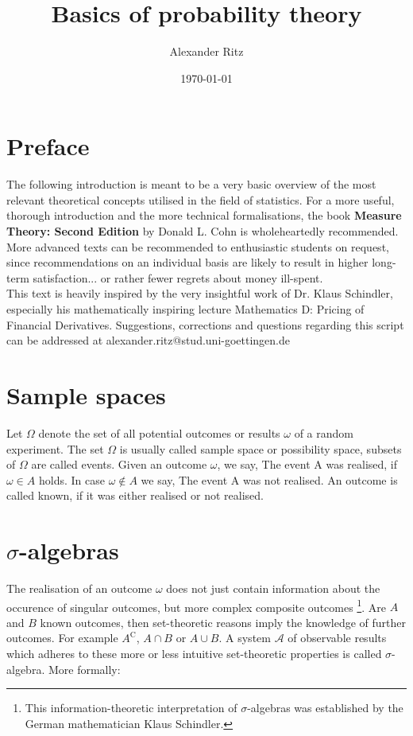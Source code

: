 \documentclass[12pt]{article}
\title{Basics of probability theory}
\author{Alexander Ritz}
\date{\today}
\begin{document}
\maketitle


\section{Preface}
The following introduction is meant to be a very basic overview of the most relevant theoretical concepts utilised in the field of statistics. For a more useful, thorough introduction and the more technical formalisations, the book \textbf{Measure Theory: Second Edition} by Donald L. Cohn is wholeheartedly recommended. More advanced texts can be recommended to enthusiastic students on request, since recommendations on an individual basis are likely to result in higher long-term satisfaction... or rather fewer regrets about money ill-spent.\\
This text is heavily inspired by the very insightful work of Dr. Klaus Schindler, especially his mathematically inspiring lecture \glqq Mathematics D: Pricing of Financial Derivatives\grqq .
\newline
Suggestions, corrections and questions regarding this script can be addressed at alexander.ritz@stud.uni-goettingen.de
\newpage

\section{Sample spaces}

Let $\Omega$ denote the set of all potential outcomes or results $\omega$ of a random experiment. The
set $\Omega$ is usually called sample space or possibility space, subsets of $\Omega$ 
 are called events. Given an outcome $\omega$, we say, \glqq The event A was realised\grqq ,
if $\omega \in A$ holds. In case $\omega \notin A$ we say, \glqq The event A was not realised\grqq . An outcome is called known, if it was either realised or not realised.

\section{$\sigma$-algebras}
The realisation of an outcome $\omega$ does not just contain information about the occurence of singular outcomes, but more complex composite outcomes \footnote{This information-theoretic interpretation of $\sigma$-algebras was established by the German mathematician Klaus Schindler.}. Are $A$ and $B$ known outcomes, then set-theoretic reasons imply the knowledge of further outcomes. For example $A^{\mathrm{C}}$, $A \cap B$ or $A \cup B$. A system $\mathscr{A}$ of
observable results which adheres to these more or less intuitive set-theoretic properties is called $\sigma$-algebra. More formally: \\
\end{document}
